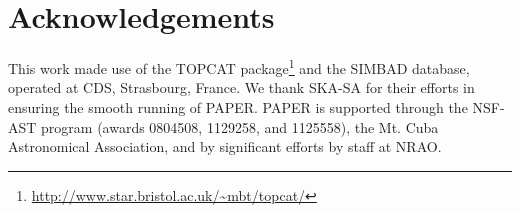 \documentclass[useAMS,usenatbib]{mn2e}
\begin{document}
\section*{Acknowledgements}
This work made use of the TOPCAT package\footnote{\url{http://www.star.bristol.ac.uk/~mbt/topcat/}} and the SIMBAD database, operated at CDS, Strasbourg, France.
We thank SKA-SA for their efforts in ensuring the smooth running of PAPER. PAPER is supported through the NSF-AST program (awards 0804508, 1129258, and 1125558), the Mt. Cuba Astronomical Association, and by significant efforts by staff at NRAO. 


{}
\end{document}
